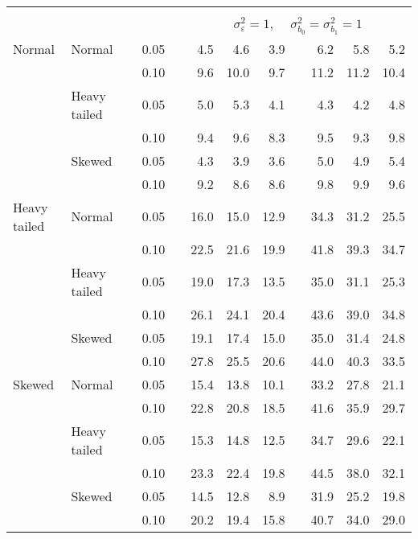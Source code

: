 \begin{table}[ht]
\begin{scriptsize}
\begin{center}
\begin{tabular}{ll p{.1cm} c p{.1cm} rrr p{.1cm} rrr}
&&&&&&&&&&&\\
& && && \multicolumn{7}{c}{$\sigma_{\varepsilon}^2 = 1$, \ \ $\sigma_{b_0}^2 = \sigma_{b_1}^2 = 1$} \\ \cline{6-12}
Normal       & Normal       && 0.05 &&   4.5 & 4.6 & 3.9 &   & 6.2 & 5.8 & 5.2 \\ 
             &              && 0.10 &&   9.6 & 10.0 & 9.7 &   & 11.2 & 11.2 & 10.4 \\ 
             & Heavy tailed && 0.05 &&   5.0 & 5.3 & 4.1 &   & 4.3 & 4.2 & 4.8 \\ 
             &              && 0.10 &&   9.4 & 9.6 & 8.3 &   & 9.5 & 9.3 & 9.8 \\ 
             & Skewed       && 0.05 &&   4.3 & 3.9 & 3.6 &   & 5.0 & 4.9 & 5.4 \\ 
             &              && 0.10 &&   9.2 & 8.6 & 8.6 &   & 9.8 & 9.9 & 9.6 \\ 
Heavy tailed & Normal       && 0.05 &&   16.0 & 15.0 & 12.9 &   & 34.3 & 31.2 & 25.5 \\ 
             &              && 0.10 &&   22.5 & 21.6 & 19.9 &   & 41.8 & 39.3 & 34.7 \\ 
             & Heavy tailed && 0.05 &&   19.0 & 17.3 & 13.5 &   & 35.0 & 31.1 & 25.3 \\ 
             &              && 0.10 &&   26.1 & 24.1 & 20.4 &   & 43.6 & 39.0 & 34.8 \\ 
             & Skewed       && 0.05 &&   19.1 & 17.4 & 15.0 &   & 35.0 & 31.4 & 24.8 \\ 
             &              && 0.10 &&   27.8 & 25.5 & 20.6 &   & 44.0 & 40.3 & 33.5 \\ 
Skewed       & Normal       && 0.05 &&   15.4 & 13.8 & 10.1 &   & 33.2 & 27.8 & 21.1 \\ 
             &              && 0.10 &&   22.8 & 20.8 & 18.5 &   & 41.6 & 35.9 & 29.7 \\ 
             & Heavy tailed && 0.05 &&   15.3 & 14.8 & 12.5 &   & 34.7 & 29.6 & 22.1 \\ 
             &              && 0.10 &&   23.3 & 22.4 & 19.8 &   & 44.5 & 38.0 & 32.1 \\ 
             & Skewed       && 0.05 &&   14.5 & 12.8 & 8.9 &   & 31.9 & 25.2 & 19.8 \\ 
             &              && 0.10 &&   20.2 & 19.4 & 15.8 &   & 40.7 & 34.0 & 29.0 \\ 



\end{tabular}
\end{center}
\end{scriptsize}
\end{table}
